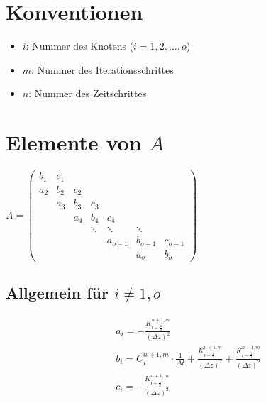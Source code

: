 \documentclass[a4paper,12pt] {article}
\begin{document}

\newpage


\section{Konventionen}

\begin{itemize}
\item $i$: Nummer des Knotens ($i = 1,2, \ldots, o$)
\item $m$: Nummer des Iterationsschrittes
\item $n$: Nummer des Zeitschrittes
\end{itemize}

\section{Elemente von $A$}

\begin{math}
  A = 
  \begin{pmatrix}
    b_1 & c_1 & & & & & \\
    a_2 & b_2 & c_2 & & & & \\
    & a_3 & b_3 & c_3 & & & \\
    & & a_4 & b_4 & c_4 & & \\
    & & & \ddots & \ddots & \ddots & \\
    & & & & a_{o-1} & b_{o-1} & c_{o-1} \\
    & & & & & a_o & b_o
  \end{pmatrix}
\end{math}

\subsection{Allgemein für $i \neq 1,o$}

\begin{equation*}
  \begin{split}
    &a_i = - \frac{K_{i-\frac{1}{2}}^{n+1,m}}{\left(\Delta z\right)^2} \\
    &b_i = C_i^{n+1,m} \cdot \frac{1}{\Delta t} + \frac{K_{i+\frac{1}{2}}^{n+1,m}}{\left(\Delta z\right)^2} + \frac{K_{i-\frac{1}{2}}^{n+1,m}}{\left(\Delta z\right)^2} \\
    &c_i = - \frac{K_{i+\frac{1}{2}}^{n+1,m}}{\left(\Delta z\right)^2}
  \end{split}
\end{equation*}
\end{document}
